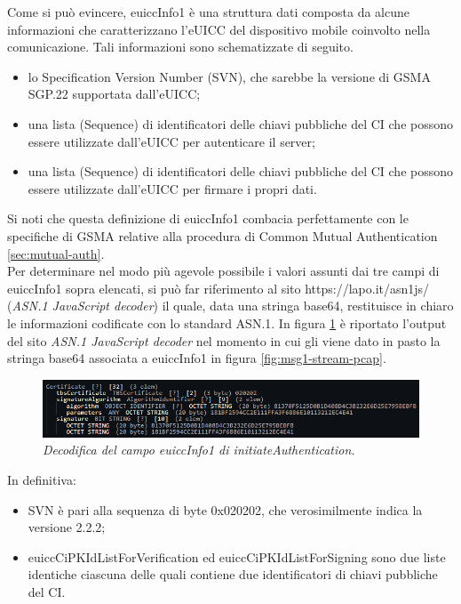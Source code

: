 \documentclass[10pt, oneside]{book}
\begin{document}
Come si può evincere, euiccInfo1 è una struttura dati composta da alcune informazioni che caratterizzano l'eUICC del dispositivo mobile coinvolto nella comunicazione. Tali informazioni sono schematizzate di seguito.
\begin{itemize}
\item lo Specification Version Number (SVN), che sarebbe la versione di GSMA SGP.22 supportata dall'eUICC;
\item una lista (Sequence) di identificatori delle chiavi pubbliche del CI che possono essere utilizzate dall'eUICC per autenticare il server;
\item una lista (Sequence) di identificatori delle chiavi pubbliche del CI che possono essere utilizzate dall'eUICC per firmare i propri dati.
\end{itemize}
Si noti che questa definizione di euiccInfo1 combacia perfettamente con le specifiche di GSMA \cite{GSMA-docs-new} relative alla procedura di Common Mutual Authentication \ref{sec:mutual-auth}.\\
Per determinare nel modo più agevole possibile i valori assunti dai tre campi di euiccInfo1 sopra elencati, si può far riferimento al sito https://lapo.it/asn1js/ (\textit{ASN.1 JavaScript decoder}) il quale, data una stringa base64, restituisce in chiaro le informazioni codificate con lo standard ASN.1. In figura \ref{fig:decode-euiccInfo1} è riportato l'output del sito \textit{ASN.1 JavaScript decoder} nel momento in cui gli viene dato in pasto la stringa base64 associata a euiccInfo1 in figura \ref{fig:msg1-stream-pcap}.
\begin{figure}
\includegraphics[width=\linewidth]{decode-euiccInfo1.png}
\caption{\textit{Decodifica del campo euiccInfo1 di initiateAuthentication.}}
\label{fig:decode-euiccInfo1}
\end{figure}
In definitiva:
\begin{itemize}
\item SVN è pari alla sequenza di byte 0x020202, che verosimilmente indica la versione 2.2.2;
\item euiccCiPKIdListForVerification ed euiccCiPKIdListForSigning sono due liste identiche ciascuna delle quali contiene due identificatori di chiavi pubbliche del CI.
\end{itemize}
\end{document}
